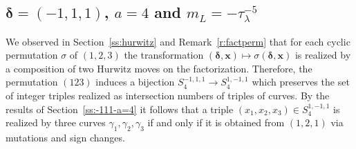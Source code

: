 \documentclass[11pt,a4paper]{amsart}
\newcommand{\de}{\delta}
\newcommand{\si}{\sigma}
\newcommand{\ga}{\gamma}
\newcommand{\la}{\lambda}
\newcommand{\bde}{\bm{\de}}
\newcommand{\bx}{\bm{x}}
\theoremstyle{definition}
\numberwithin{equation}{section}
\begin{document}
\subsection{$\bde = (-1,1,1)$, $a=4$ and $m_L=-\tau_\la^{-5}$}\label{ss:pairs=-111-a=4}

We observed in Section~\ref{ss:hurwitz} and Remark~\ref{r:factperm} that for each cyclic permutation $\sigma$ of $(1,2,3)$ the transformation 
$(\bde,\bx)\mapsto\si(\bde,\bx)$ is realized by a composition of two Hurwitz moves on the factorization. 
Therefore, the permutation $(123)$ induces a bijection $S^{-1,1,1}_4\to S^{1,-1,1}_4$ which preserves the set of integer triples realized as intersection numbers of triples of curves. 
By the results of Section~\ref{ss:-111-a=4} it follows that a triple 
$(x_1,x_2,x_3) \in S_4^{1,-1,1}$ is realized by three curves 
$\ga_1,\ga_2,\ga_3$ if and only if it is obtained from $(1,2,1)$ via mutations and sign changes.
\end{document}
